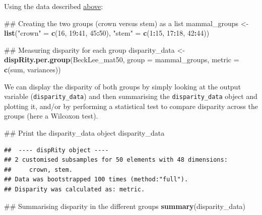 \documentclass[]{book}
\newenvironment{Shaded}{\begin{snugshade}}{\end{snugshade}}
\newcommand{\KeywordTok}[1]{\textcolor[rgb]{0.13,0.29,0.53}{\textbf{#1}}}
\newcommand{\DataTypeTok}[1]{\textcolor[rgb]{0.13,0.29,0.53}{#1}}
\newcommand{\DecValTok}[1]{\textcolor[rgb]{0.00,0.00,0.81}{#1}}
\newcommand{\StringTok}[1]{\textcolor[rgb]{0.31,0.60,0.02}{#1}}
\newcommand{\OperatorTok}[1]{\textcolor[rgb]{0.81,0.36,0.00}{\textbf{#1}}}
\newcommand{\NormalTok}[1]{#1}
\theoremstyle{definition}
\theoremstyle{definition}
\theoremstyle{remark}
\begin{document}
Using the \citet{beckancient2014} data described
\protect\hyperlink{example-data}{above}:

\begin{Shaded}
\begin{Highlighting}[]
\NormalTok{## Creating the two groups (crown versus stem) as a list}
\NormalTok{mammal_groups <-}\StringTok{ }\KeywordTok{list}\NormalTok{(}\StringTok{"crown"}\NormalTok{ =}\StringTok{ }\KeywordTok{c}\NormalTok{(}\DecValTok{16}\NormalTok{, }\DecValTok{19}\OperatorTok{:}\DecValTok{41}\NormalTok{, }\DecValTok{45}\OperatorTok{:}\DecValTok{50}\NormalTok{),}
                      \StringTok{"stem"}\NormalTok{ =}\StringTok{ }\KeywordTok{c}\NormalTok{(}\DecValTok{1}\OperatorTok{:}\DecValTok{15}\NormalTok{, }\DecValTok{17}\OperatorTok{:}\DecValTok{18}\NormalTok{, }\DecValTok{42}\OperatorTok{:}\DecValTok{44}\NormalTok{))}

\NormalTok{## Measuring disparity for each group}
\NormalTok{disparity_data <-}\StringTok{ }\KeywordTok{dispRity.per.group}\NormalTok{(BeckLee_mat50, }\DataTypeTok{group =}\NormalTok{ mammal_groups,}
                                     \DataTypeTok{metric =} \KeywordTok{c}\NormalTok{(sum, variances))}
\end{Highlighting}
\end{Shaded}

We can display the disparity of both groups by simply looking at the
output variable (\texttt{disparity\_data}) and then summarising the
\texttt{disparity\_data} object and plotting it, and/or by performing a
statistical test to compare disparity across the groups (here a Wilcoxon
test).

\begin{Shaded}
\begin{Highlighting}[]
\NormalTok{## Print the disparity_data object}
\NormalTok{disparity_data}
\end{Highlighting}
\end{Shaded}

\begin{verbatim}
##  ---- dispRity object ---- 
## 2 customised subsamples for 50 elements with 48 dimensions:
##     crown, stem.
## Data was bootstrapped 100 times (method:"full").
## Disparity was calculated as: metric.
\end{verbatim}

\begin{Shaded}
\begin{Highlighting}[]
\NormalTok{## Summarising disparity in the different groups}
\KeywordTok{summary}\NormalTok{(disparity_data)}
\end{Highlighting}
\end{Shaded}
\end{document}
